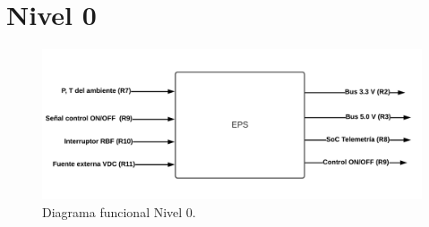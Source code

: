 
\section{Nivel 0}

\begin{figure}[h!]
\centering
\includegraphics[width=\textwidth]{Pictures/Level0.png}
\caption{Diagrama funcional Nivel 0.}\label{fig:Level0}
\end{figure}

